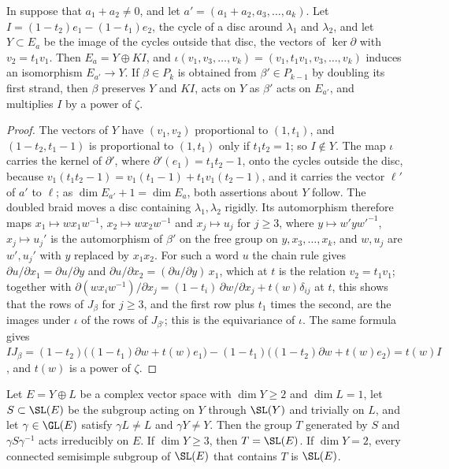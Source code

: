 \begin{lemma}\label{lem:cabling}
In  suppose that $a_{1}+a_{2}\ne0$, and let
$a'=(a_{1}+a_{2},a_{3},\dots,a_{k})$. Let $I=(1-t_{2})e_{1}-(1-t_{1})e_{2}$,
the cycle of a disc around $\lambda_{1}$ and $\lambda_{2}$, and let
$Y\subset E_{a}$ be the image of the cycles outside that disc, the vectors of
$\ker\partial$ with $v_{2}=t_{1}v_{1}$. Then $E_{a}=Y\oplus KI$, and
$\iota(v_{1},v_{3},\dots,v_{k})=(v_{1},t_{1}v_{1},v_{3},\dots,v_{k})$ induces an
isomorphism $E_{a'}\to Y$. If $\beta\in P_{k}$ is obtained from
$\beta'\in P_{k-1}$ by doubling its first strand, then $\beta$ preserves $Y$
and $KI$, acts on $Y$ as $\beta'$ acts on $E_{a'}$, and multiplies $I$ by a
power of $\zeta$.
\end{lemma}

\begin{proof}
The vectors of $Y$ have $(v_{1},v_{2})$ proportional to $(1,t_{1})$, and
$(1-t_{2},t_{1}-1)$ is proportional to $(1,t_{1})$ only if $t_{1}t_{2}=1$; so
$I\notin Y$. The map $\iota$ carries the kernel of $\partial'$, where
$\partial'(e_{1})=t_{1}t_{2}-1$, onto the cycles outside the disc, because
$v_{1}(t_{1}t_{2}-1)=v_{1}(t_{1}-1)+t_{1}v_{1}(t_{2}-1)$, and it carries the
vector $\ell'$ of $a'$ to $\ell$; as $\dim E_{a'}+1=\dim E_{a}$, both
assertions about $Y$ follow. The doubled braid moves a disc containing
$\lambda_{1},\lambda_{2}$ rigidly. Its automorphism therefore maps
$x_{1}\mapsto wx_{1}w^{-1}$, $x_{2}\mapsto wx_{2}w^{-1}$ and $x_{j}\mapsto
u_{j}$ for $j\ge3$, where $y\mapsto w'yw'^{-1}$, $x_{j}\mapsto u_{j}'$ is the
automorphism of $\beta'$ on the free group on $y,x_{3},\dots,x_{k}$, and
$w,u_{j}$ are $w',u_{j}'$ with $y$ replaced by $x_{1}x_{2}$. For such a word
$u$ the chain rule gives $\partial u/\partial x_{1}=\partial u/\partial y$
and $\partial u/\partial x_{2}=(\partial u/\partial y)\,x_{1}$, which at $t$ is
the relation $v_{2}=t_{1}v_{1}$; together with
$\partial(wx_{i}w^{-1})/\partial x_{j}=(1-t_{i})\,\partial w/\partial
x_{j}+t(w)\delta_{ij}$ at $t$, this shows that the rows of $J_{\beta}$ for
$j\ge3$, and the first row plus $t_{1}$ times the second, are the images under
$\iota$ of the rows of $J_{\beta'}$; this is the equivariance of $\iota$. The
same formula gives $IJ_{\beta}=(1-t_{2})\bigl((1-t_{1})\partial w+t(w)e_{1}\bigr)
-(1-t_{1})\bigl((1-t_{2})\partial w+t(w)e_{2}\bigr)=t(w)I$, and $t(w)$ is a
power of $\zeta$.
\end{proof}

\begin{lemma}\label{lem:hyperplanes}
Let $E=Y\oplus L$ be a complex vector space with $\dim Y\ge2$ and
$\dim L=1$, let $S\subset\SL(E)$ be the subgroup acting on $Y$ through
$\SL(Y)$ and trivially on $L$, and let $\gamma\in\GL(E)$ satisfy
$\gamma L\ne L$ and $\gamma Y\ne Y$. Then the group $T$ generated by $S$ and
$\gamma S\gamma^{-1}$ acts irreducibly on $E$. If $\dim Y\ge3$, then
$T=\SL(E)$. If $\dim Y=2$, every connected semisimple subgroup of $\SL(E)$
that contains $T$ is $\SL(E)$.
\end{lemma}

